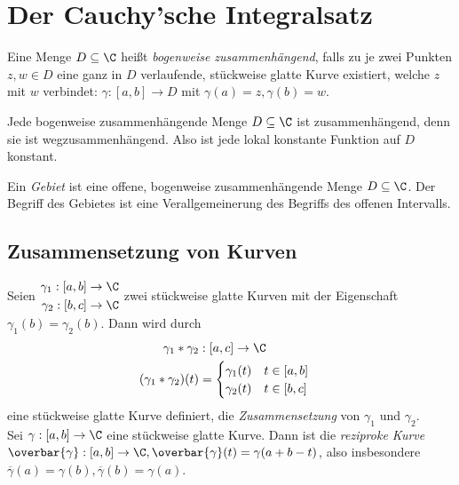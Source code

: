 \section{Der Cauchy'sche Integralsatz}\lecture
		
		\begin{defn}
			Eine Menge $ D \subseteq \C $ heißt \emph{bogenweise zusammenhängend}, falls zu je zwei Punkten $ z,w \in D $ eine ganz in $D$ verlaufende, stückweise glatte Kurve existiert, welche $z$ mit $w$ verbindet: $ \gamma: [a,b] \to D $ mit $ \gamma(a) = z, \gamma(b)=w $.
		\end{defn}
		
		\begin{rem}
			Jede bogenweise zusammenhängende Menge $ D \subseteq \C $ ist zusammenhängend, denn sie ist wegzusammenhängend. Also ist jede lokal konstante Funktion auf $D$ konstant.
		\end{rem}
		\begin{defn}[Gebiet]
			Ein \emph{Gebiet} ist eine offene, bogenweise zusammenhängende Menge $ D \subseteq \C $. Der Begriff des Gebietes ist eine Verallgemeinerung des Begriffs des offenen Intervalls.
		\end{defn}
	
		\subsection*{Zusammensetzung von Kurven}
		Seien $\begin{aligned}
			\gamma_1 : [a,b] \to \C\\
			\gamma_2 : [b,c] \to \C
		\end{aligned}$ zwei stückweise glatte Kurven mit der Eigenschaft $ \gamma_1(b) = \gamma_2(b) $. Dann wird durch 
		\begin{align*}
			\gamma_1 * \gamma_2 &: [a,c] \to \C\\
			(\gamma_1 * \gamma_2)(t) &= \begin{cases}
				\gamma_1 (t) \quad t \in [a,b]\\
				\gamma_2 (t) \quad t \in [b,c]
				\end{cases}
		\end{align*}
		eine stückweise glatte Kurve definiert, die \emph{Zusammensetzung} von $\gamma_1$ und $\gamma_2$.\\
		Sei $ \gamma: [a,b] \to \C $ eine stückweise glatte Kurve. Dann ist die \emph{reziproke Kurve} $ \overbar{\gamma}: [a,b] \to \C, \overbar{\gamma}(t) = \gamma(a+b-t)$, also insbesondere $ \overbar{\gamma}(a) = \gamma(b), \overbar{\gamma}(b) = \gamma(a) $.
		
